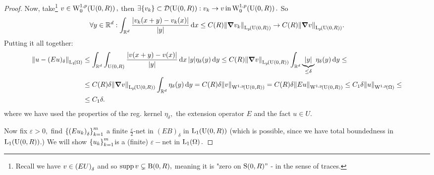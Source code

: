 \documentclass{article}
\begin{document}
\begin{proof}
	Now, take\footnote{Recall we have $v \in \qty(EU)_{\delta}$ and so $\operatorname{supp} v \subsetneq \text{B}(0,R),$ meaning it is "zero on $\text{S}(0,R)"$ - in the sense of traces.} $v \in \WkpzeroSet[1][p]{\text{U}(0,R)}, $ then $\exists \{v_k\} \subset \mathcal{D}\qty(\text{U}(0,R)): v_k \to v \, \text{in} \, \WkpzeroSet[1][p]{\text{U}(0,R)}.$ So
	\[
		\forall y \in \R^d: \int_{\R^d}\frac{|v_k(x+y)-v_k(x)|}{|y|}\dd{x}\leq C(R) \norm{\grad v_k}_{\LpSet{\text{U}(0,R)}}\to C(R) \norm{\grad v}_{\LpSet{\text{U}(0,R)}}.
	\]
	Putting it all together:
	\begin{align*}
		\norm{u-(Eu)_{\delta}}_{\LpSet[1]{\Omega}} &\leq \int_{\R^d}\int_{\text{U}(0,R)}\frac{|v(x+y)-v(x)|}{|y|}\dd{x} |y| \eta_{\delta}(y)\dd{y} \leq C(R) \norm{\grad v}_{\LpSet{\text{U}(0,R)}} \int_{\R^d}\underbrace{|y|}_{\leq \delta} \eta_{\delta}(y)\dd{y} \leq \\
		&\leq C(R) \delta \norm{\grad v}_{\LpSet{\text{U}(0,R)}}\int_{\R^{d}}\eta_{\delta}(y)\dd{y} = C(R) \delta \norm{v}_{\WkpSet[1][p]{\text{U}(0,R)}} = C(R) \delta \norm{Eu}_{\WkpSet[1][p]{\text{U}(0,R)}} \leq C_1 \delta \norm{u}_{\WkpSet[1][p]{\Omega}}\leq \\
		&\leq C_1 \delta.
	\end{align*}
	where we have used the properties of the reg. kernel $\eta_{\delta},$ the extension operator $E$ and the fact $u \in U.$

	Now fix $\varepsilon >0, $ find $\qty{\qty(Eu_k)_{\delta}}_{k=1}^m$ a finite $\frac{\varepsilon}{2}$-net in $(EB)_{\delta}$ in $\LpSet[1]{\text{U}(0,R)}$ (which is possible, since we have total boundedness in $\LpSet[1]{\text{U}(0,R)}$.) We will show $\qty{u_k}_{k=1}^m$is a (finite) $\varepsilon-$net in $\LpSet[1]{\Omega}.$


\end{proof}
\end{document}
